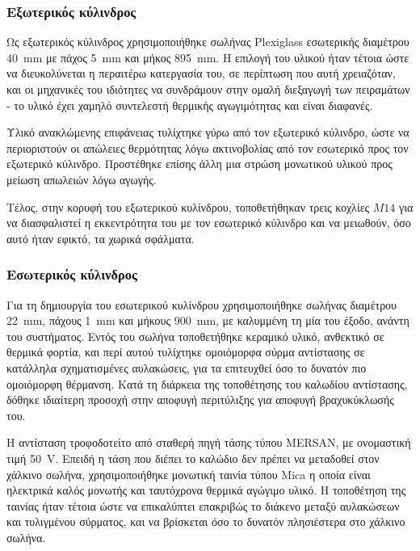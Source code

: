  
\subsubsection{Εξωτερικός κύλινδρος}

\noindent Ως εξωτερικός κύλινδρος χρησιμοποιήθηκε σωλήνας Plexiglass εσωτερικής διαμέτρου \qty{40}{\milli\metre} με πάχος \qty{5}{\milli\metre} και μήκος \qty{895}{\milli\metre}. Η επιλογή του υλικού ήταν τέτοια ώστε να διευκολύνεται η περαιτέρω κατεργασία του, σε περίπτωση που αυτή χρειαζόταν, και οι μηχανικές του ιδιότητες να συνδράμουν στην ομαλή διεξαγωγή των πειραμάτων - το υλικό έχει χαμηλό συντελεστή θερμικής αγωγιμότητας και είναι διαφανές.

Υλικό ανακλώμενης επιφάνειας τυλίχτηκε γύρω από τον εξωτερικό κύλινδρο, ώστε να περιοριστούν οι απώλειες θερμότητας λόγω ακτινοβολίας από τον εσωτερικό προς τον εξωτερικό κύλινδρο. Προστέθηκε επίσης άλλη μια στρώση μονωτικού υλικού προς μείωση απωλειών λόγω αγωγής.

Τέλος, στην κορυφή του εξωτερικού κυλίνδρου, τοποθετήθηκαν τρεις κοχλίες $Μ14$ για να διασφαλιστεί η εκκεντρότητα του με τον εσωτερικό κύλινδρο και να μειωθούν, όσο αυτό ήταν εφικτό, τα χωρικά σφάλματα.

\subsubsection{Εσωτερικός κύλινδρος}

\noindent Για τη δημιουργία του εσωτερικού κυλίνδρου χρησιμοποιήθηκε σωλήνας διαμέτρου \qty{22}{\milli\metre}, πάχους \qty{1}{\milli\metre} και μήκους \qty{900}{\milli\metre}, με καλυμμένη τη μία του έξοδο, ανάντη του συστήματος. Εντός του σωλήνα τοποθετήθηκε κεραμικό υλικό, ανθεκτικό σε θερμικά φορτία, και περί αυτού τυλίχτηκε ομοιόμορφα σύρμα αντίστασης σε κατάλληλα σχηματισμένες αυλακώσεις, για τα επιτευχθεί όσο το δυνατόν πιο ομοιόμορφη θέρμανση. Κατά τη διάρκεια της τοποθέτησης του καλωδίου αντίστασης, δόθηκε ιδιαίτερη προσοχή στην αποφυγή περιτύλιξης για αποφυγή βραχυκύκλωσής του.

Η αντίσταση τροφοδοτείτο από σταθερή πηγή τάσης τύπου MERSAN, με ονομαστική τιμή \qty{50}{\volt}. Επειδή η τάση που διέπει το καλώδιο δεν πρέπει να μεταδοθεί στον χάλκινο σωλήνα, χρησιμοποιήθηκε μονωτική ταινία τύπου Mica η οποία είναι ηλεκτρικά καλός μονωτής και ταυτόχρονα θερμικά αγώγιμο υλικό. Η τοποθέτηση της ταινίας ήταν τέτοια ώστε να επικαλύπτει επακριβώς το διάκενο μεταξύ αυλακώσεων και τυλιγμένου σύρματος, και να βρίσκεται όσο το δυνατόν πλησιέστερα στο χάλκινο σωλήνα.

